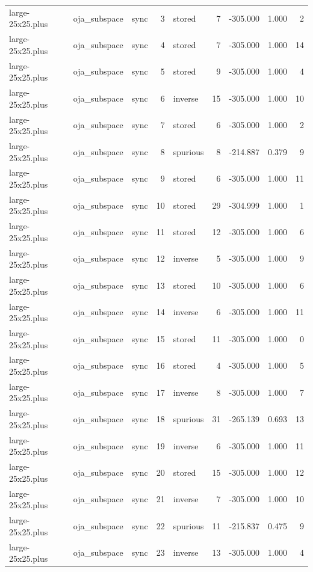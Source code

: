 \begin{tabular}{lllrlrrrr}
large-25x25.plus & oja\_subspace & sync & 3 & stored & 7 & -305.000 & 1.000 & 2 \\
large-25x25.plus & oja\_subspace & sync & 4 & stored & 7 & -305.000 & 1.000 & 14 \\
large-25x25.plus & oja\_subspace & sync & 5 & stored & 9 & -305.000 & 1.000 & 4 \\
large-25x25.plus & oja\_subspace & sync & 6 & inverse & 15 & -305.000 & 1.000 & 10 \\
large-25x25.plus & oja\_subspace & sync & 7 & stored & 6 & -305.000 & 1.000 & 2 \\
large-25x25.plus & oja\_subspace & sync & 8 & spurious & 8 & -214.887 & 0.379 & 9 \\
large-25x25.plus & oja\_subspace & sync & 9 & stored & 6 & -305.000 & 1.000 & 11 \\
large-25x25.plus & oja\_subspace & sync & 10 & stored & 29 & -304.999 & 1.000 & 1 \\
large-25x25.plus & oja\_subspace & sync & 11 & stored & 12 & -305.000 & 1.000 & 6 \\
large-25x25.plus & oja\_subspace & sync & 12 & inverse & 5 & -305.000 & 1.000 & 9 \\
large-25x25.plus & oja\_subspace & sync & 13 & stored & 10 & -305.000 & 1.000 & 6 \\
large-25x25.plus & oja\_subspace & sync & 14 & inverse & 6 & -305.000 & 1.000 & 11 \\
large-25x25.plus & oja\_subspace & sync & 15 & stored & 11 & -305.000 & 1.000 & 0 \\
large-25x25.plus & oja\_subspace & sync & 16 & stored & 4 & -305.000 & 1.000 & 5 \\
large-25x25.plus & oja\_subspace & sync & 17 & inverse & 8 & -305.000 & 1.000 & 7 \\
large-25x25.plus & oja\_subspace & sync & 18 & spurious & 31 & -265.139 & 0.693 & 13 \\
large-25x25.plus & oja\_subspace & sync & 19 & inverse & 6 & -305.000 & 1.000 & 11 \\
large-25x25.plus & oja\_subspace & sync & 20 & stored & 15 & -305.000 & 1.000 & 12 \\
large-25x25.plus & oja\_subspace & sync & 21 & inverse & 7 & -305.000 & 1.000 & 10 \\
large-25x25.plus & oja\_subspace & sync & 22 & spurious & 11 & -215.837 & 0.475 & 9 \\
large-25x25.plus & oja\_subspace & sync & 23 & inverse & 13 & -305.000 & 1.000 & 4 \\

\end{tabular}
